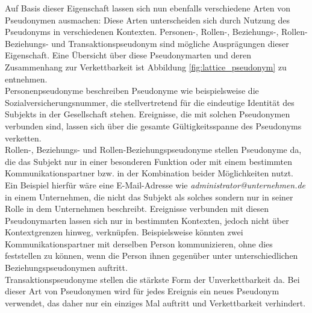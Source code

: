 Auf Basis dieser Eigenschaft lassen sich nun ebenfalls verschiedene Arten von Pseudonymen ausmachen:
Diese Arten unterscheiden sich durch Nutzung des Pseudonyms in verschiedenen Kontexten. Personen-, Rollen-, Beziehungs-, Rollen-Beziehungs- und Transaktionspseudonym sind mögliche Ausprägungen dieser Eigenschaft. Eine Übersicht über diese Pseudonymarten und deren Zusammenhang zur Verkettbarkeit ist Abbildung \ref{fig:lattice_pseudonym} zu entnehmen.\\
Personenpseudonyme beschreiben Pseudonyme wie beispielsweise die Sozialversicherungsnummer, die stellvertretend für die eindeutige Identität des Subjekts in der Gesellschaft stehen. Ereignisse, die mit solchen Pseudonymen verbunden sind, lassen sich über die gesamte Gültigkeitsspanne des Pseudonyms verketten. \\
Rollen-, Beziehungs- und Rollen-Beziehungspseudonyme stellen Pseudonyme da, die das Subjekt nur in einer besonderen Funktion oder mit einem bestimmten Kommunikationspartner bzw. in der Kombination beider Möglichkeiten nutzt. Ein Beispiel hierfür wäre eine E-Mail-Adresse wie \textit{administrator@unternehmen.de} in einem Unternehmen, die nicht das Subjekt als solches sondern nur in seiner Rolle in dem Unternehmen beschreibt. Ereignisse verbunden mit diesen Pseudonymarten lassen sich nur in bestimmten Kontexten, jedoch nicht über Kontextgrenzen hinweg, verknüpfen. Beispielsweise könnten zwei Kommunikationspartner mit derselben Person kommunizieren, ohne dies feststellen zu können, wenn die Person ihnen gegenüber unter unterschiedlichen Beziehungspseudonymen auftritt.\\
Transaktionspseudonyme stellen die stärkste Form der Unverkettbarkeit da. Bei dieser Art von Pseudonymen wird für jedes Ereignis ein neues Pseudonym verwendet, das daher nur ein einziges Mal auftritt und Verkettbarkeit verhindert.


